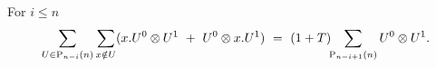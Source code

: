 

\begin{lemma} \label{lemma: boundary gives the lower case}
	For $i \leq n$
	\begin{equation} \label{lemma4: existence: eq1}
	\sum_{U \in \P_{n-i}(n)} \sum_{x \notin U} ({x.U^0} \ot {U^1}\ +\ {U^0} \ot {x.U^1})\ = \
	(1+T) \!\! \sum_{\P_{n-i+1}(n)} {U^0} \ot {U^1.}
	\end{equation}
\end{lemma}

